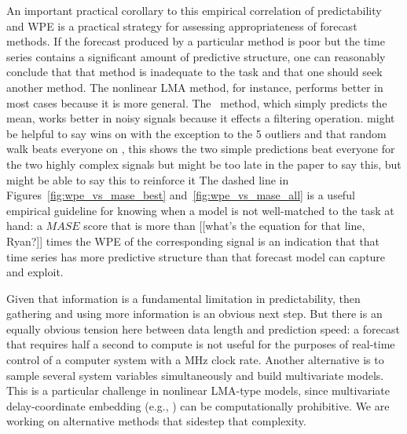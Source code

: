 An important practical corollary to this empirical correlation of
predictability and WPE is a practical strategy for assessing
appropriateness of forecast methods.  If the forecast produced by a
particular method is poor but the time series contains a significant
amount of predictive structure, one can reasonably conclude that that
method is inadequate to the task and that one should seek another
method.  The nonlinear LMA method, for instance, performs better in
most cases because it is more general.  The \naive ~method, which
simply predicts the mean, works better in noisy signals because it
effects a filtering operation.{\color{red} might be helpful to say \naive wins on \svdone with the exception to the 5 outliers and that random walk beats everyone on \gcc, this shows the two simple predictions beat everyone for the two highly complex signals but might be too late in the paper to say this, but might be able to say this to reinforce it}   The dashed line in
Figures~\ref{fig:wpe_vs_mase_best} and~\ref{fig:wpe_vs_mase_all} is a
useful empirical guideline for knowing when a model is not
well-matched to the task at hand: a $MASE$ score that is more than
{\color{red}[[what's the equation for that line, Ryan?]]} times the
WPE of the corresponding signal is an indication that that time series
has more predictive structure than that forecast model can capture and
exploit.

Given that information is a fundamental limitation in predictability,
then gathering and using more information is an obvious next step.
But there is an equally obvious tension here between data length and
prediction speed: a forecast that requires half a second to compute is
not useful for the purposes of real-time control of a computer system
with a MHz clock rate.  Another alternative is to sample several
system variables simultaneously and build multivariate models.  This
is a particular challenge in nonlinear LMA-type models, since
multivariate delay-coordinate embedding (e.g.,
\cite{cao-multivariate-embedding,deyle-sugihara2011}) can be
computationally prohibitive.  We are working on alternative methods
that sidestep that complexity.


